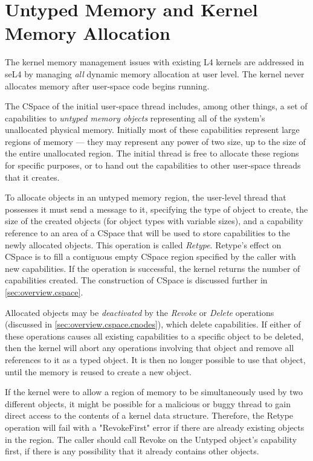 \section{Untyped Memory and Kernel Memory Allocation}\label{sec:sel4:alloc}

The kernel memory management issues with existing L4 kernels are addressed in
seL4 by managing \emph{all} dynamic memory allocation at user level. The
kernel never allocates memory after user-space code begins running.

The CSpace of the initial user-space thread includes, among other things, a
set of capabilities to \emph{untyped memory objects} representing all of the
system's unallocated physical memory. Initially most of these capabilities
represent large regions of memory --- they may represent any power of two
size, up to the size of the entire unallocated region. The initial thread is
free to allocate these regions for specific purposes, or to hand out the
capabilities to other user-space threads that it creates.

To allocate objects in an untyped memory region, the user-level thread that
possesses it must send a message to it, specifying the type of object to
create, the size of the created objects (for object types with variable
sizes), and a capability reference to an area of a CSpace that will be used to
store capabilities to the newly allocated objects. This operation is called
\emph{Retype}. Retype's effect on CSpace is to fill a contiguous empty CSpace
region specified by the caller with new capabilities. If the operation is
successful, the kernel returns the number of capabilities created. The
construction of CSpace is discussed further in \autoref{sec:overview.cspace}.

Allocated objects may be \emph{deactivated} by the \emph{Revoke} or
\emph{Delete} operations (discussed in \autoref{sec:overview.cspace.cnodes}),
which delete capabilities. If either of these operations causes all existing
capabilities to a specific object to be deleted, then the kernel will abort any
operations involving that object and remove all references to it as a typed
object. It is then no longer possible to use that object, until the memory is
reused to create a new object.

If the kernel were to allow a region of memory to be simultaneously used by two
different objects, it might be possible for a malicious or buggy thread to gain
direct access to the contents of a kernel data structure. Therefore, the
Retype operation will fail with a "RevokeFirst" error if there are already
existing objects in the region. The caller should call Revoke on the Untyped
object's capability first, if there is any possibility that it already contains
other objects.

